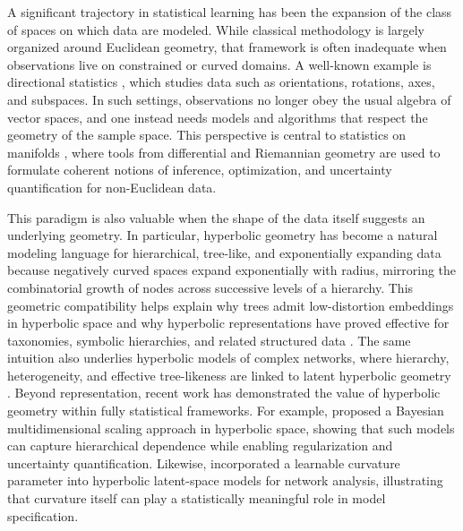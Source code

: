 \documentclass[11pt]{article}
\begin{document}
A significant trajectory in statistical learning has been the expansion of the class of spaces on which data are modeled. While classical methodology is largely organized around Euclidean geometry, that framework is often inadequate when observations live on constrained or curved domains. A well-known example is directional statistics \citep{mardia_2000_DirectionalStatistics}, which studies data such as orientations, rotations, axes, and subspaces. In such settings, observations no longer obey the usual algebra of vector spaces, and one instead needs models and algorithms that respect the geometry of the sample space. This perspective is central to statistics on manifolds \citep{bhattacharya_2012_NonparametricInferenceManifolds, patrangenaru_2016_NonparametricStatisticsManifolds}, where tools from differential and Riemannian geometry are used to formulate coherent notions of inference, optimization, and uncertainty quantification for non-Euclidean data.

This paradigm is also valuable when the shape of the data itself suggests an underlying geometry. In particular, hyperbolic geometry has become a natural modeling language for hierarchical, tree-like, and exponentially expanding data because negatively curved spaces expand exponentially with radius, mirroring the combinatorial growth of nodes across successive levels of a hierarchy. This geometric compatibility helps explain why trees admit low-distortion embeddings in hyperbolic space and why hyperbolic representations have proved effective for taxonomies, symbolic hierarchies, and related structured data \citep{sarkar_2012_LowDistortionDelaunay, nickel_2017_PoincareEmbeddingsLearning}. The same intuition also underlies hyperbolic models of complex networks, where hierarchy, heterogeneity, and effective tree-likeness are linked to latent hyperbolic geometry \citep{cunningham_2017_NavigabilityRandomGeometric}. Beyond representation, recent work has demonstrated the value of hyperbolic geometry within fully statistical frameworks. For example, \cite{liu_2024_BayesianHyperbolicMultidimensional} proposed a Bayesian multidimensional scaling approach in hyperbolic space, showing that such models can capture hierarchical dependence while enabling regularization and uncertainty quantification. Likewise, \cite{li_2026_HyperbolicNetworkLatent} incorporated a learnable curvature parameter into hyperbolic latent-space models for network analysis, illustrating that curvature itself can play a statistically meaningful role in model specification.
\end{document}
